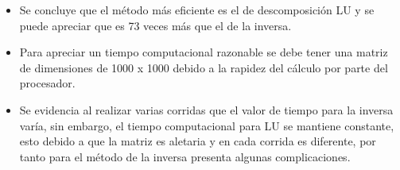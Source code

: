 \documentclass[11pt]{article}
\providecommand{\tightlist}{%
      \setlength{\itemsep}{0pt}\setlength{\parskip}{0pt}}
\begin{document}
\begin{itemize}
\tightlist
\item
  Se concluye que el método más eficiente es el de descomposición LU y se puede apreciar que es 73 veces más que el de la inversa.
\item
  Para apreciar un tiempo computacional razonable se debe tener una matriz de dimensiones de 1000 x 1000 debido a la rapidez del cálculo por parte del procesador.
\item
  Se evidencia al realizar varias corridas que el valor de tiempo para la inversa varía, sin embargo, el tiempo computacional para LU se mantiene constante, esto debido a que la matriz es aletaria y en cada corrida es diferente, por tanto para el método de la inversa presenta algunas complicaciones.
\end{itemize}


    
    
    
\end{document}
